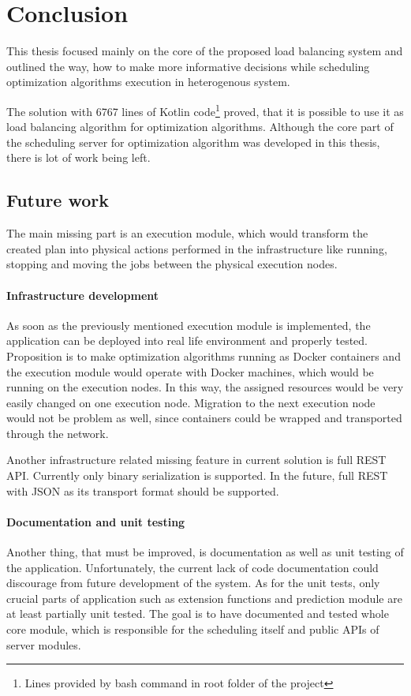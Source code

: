\chapter{Conclusion}\label{ch:conclusion}
This thesis focused mainly on the core of the proposed load balancing system
and outlined the way,
how to make more informative decisions while scheduling optimization algorithms execution in heterogenous system.

The solution with 6767 lines of Kotlin 
code\footnote{Lines provided by  bash command in root folder of the project} 
proved, that it is possible to use it as load balancing algorithm for optimization algorithms.
Although the core part of the scheduling server for optimization algorithm was developed in this thesis,
there is lot of work being left.

\section{Future work}\label{sec:future-work}
The main missing part is an execution module, 
which would transform the created plan into physical actions performed in the infrastructure 
like running, stopping and moving the jobs between the physical execution nodes.

\subsubsection{Infrastructure development}
As soon as the previously mentioned execution module is implemented,
the application can be deployed into real life environment and properly tested.
Proposition is to make optimization algorithms running as Docker containers 
and the execution module would operate with Docker machines,
which would be running on the execution nodes. 
In this way, 
the assigned resources would be very easily changed on one execution node.
Migration to the next execution node would not be problem as well, 
since containers could be wrapped and transported through the network.

Another infrastructure related missing feature in current solution is full REST API.
Currently only binary serialization is supported.
In the future, 
full REST with JSON as its transport format should be supported.

\subsubsection{Documentation and unit testing}
Another thing, that must be improved, is documentation as well as unit testing of the application.
Unfortunately, the current lack of code documentation could discourage from future development of the system.
As for the unit tests, 
only crucial parts of application such as extension functions and prediction module are at least partially unit tested.
The goal is to have documented and tested whole core module,
which is responsible for the scheduling itself and public APIs of server modules. 

